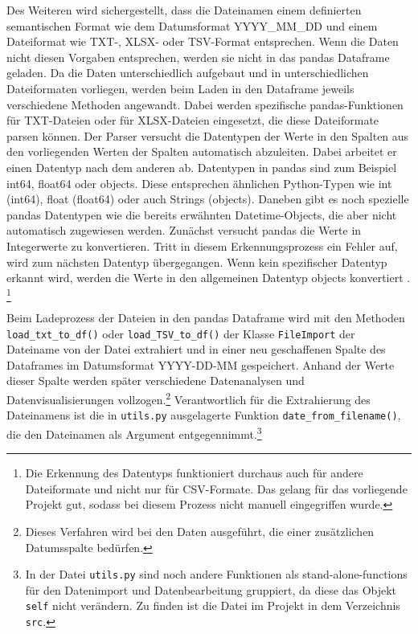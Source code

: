     Des Weiteren wird sichergestellt, dass die Dateinamen einem definierten semantischen Format wie dem Datumsformat YYYY\_MM\_DD und 
    einem Dateiformat wie TXT-, XLSX- oder TSV-Format entsprechen. Wenn die Daten nicht diesen Vorgaben entsprechen, werden sie nicht in
    das pandas Dataframe geladen. Da die Daten unterschiedlich aufgebaut und in unterschiedlichen Dateiformaten vorliegen, 
    werden beim Laden in den Dataframe jeweils verschiedene Methoden angewandt. Dabei werden spezifische pandas-Funktionen für 
    TXT-Dateien oder für XLSX-Dateien eingesetzt, die diese Dateiformate parsen können. 
    Der Parser versucht die Datentypen der Werte in den Spalten aus den vorliegenden Werten der Spalten automatisch abzuleiten. 
    Dabei arbeitet er einen Datentyp nach dem anderen ab. Datentypen in pandas sind zum Beispiel int64, float64 oder objects. 
    Diese entsprechen ähnlichen Python-Typen wie int (int64), float (float64) oder auch Strings (objects). Daneben gibt es noch spezielle pandas Datentypen wie die bereits erwähnten Datetime-Objects, die aber nicht automatisch zugewiesen werden.
    Zunächst versucht pandas die Werte in Integerwerte zu konvertieren. Tritt in diesem Erkennungsprozess ein Fehler auf, 
    wird zum nächsten Datentyp übergegangen. Wenn kein spezifischer Datentyp erkannt wird, werden die Werte in den allgemeinen Datentyp objects konvertiert \cite[vgl.][]{golubin_how_2021}.
    \footnote{ Die Erkennung des Datentyps funktioniert durchaus auch für andere Dateiformate und nicht nur für CSV-Formate. Das gelang für das vorliegende Projekt gut, sodass
    bei diesem Prozess nicht manuell eingegriffen wurde.}
    
    Beim Ladeprozess der Dateien in den pandas Dataframe wird mit den Methoden \texttt{load\_txt\_to\_df()} oder \texttt{load\_TSV\_to\_df()} 
    der Klasse \texttt{FileImport} der Dateiname von der Datei extrahiert und in einer neu geschaffenen Spalte des Dataframes im Datumsformat YYYY-DD-MM gespeichert.
    Anhand der Werte dieser Spalte werden später verschiedene Datenanalysen und Datenvisualisierungen vollzogen.\footnote{ Dieses Verfahren wird bei den Daten ausgeführt, die einer zusätzlichen Datumsspalte bedürfen.} 
    Verantwortlich für die Extrahierung des Dateinamens ist die in \texttt{utils.py} ausgelagerte Funktion \texttt{date\_from\_filename()},
    die den Dateinamen als Argument entgegennimmt.\footnote{ In der Datei \texttt{utils.py} sind noch andere Funktionen als stand-alone-functions für den Datenimport und Datenbearbeitung gruppiert,
    da diese das Objekt \texttt{self} nicht verändern. Zu finden ist die Datei im Projekt in dem Verzeichnis \texttt{src}.} 
    

